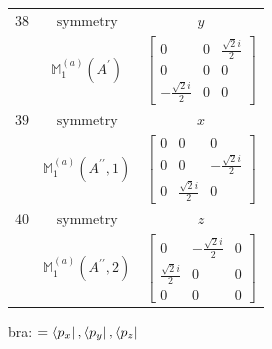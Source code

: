 \documentclass[fleqn,8pt,landscape]{jsarticle}
\begin{document}
\begin{longtable}{ccc}
$ 38 $ & $ \text{symmetry} $ & $ y $ \\
$  $ & $ \mathbb{M}_{1}^{(a)}(A^{\prime}) $ & $ \begin{bmatrix} 0 & 0 & \frac{\sqrt{2} i}{2} \\ 0 & 0 & 0 \\ - \frac{\sqrt{2} i}{2} & 0 & 0 \end{bmatrix} $ \\ \hline
$ 39 $ & $ \text{symmetry} $ & $ x $ \\
$  $ & $ \mathbb{M}_{1}^{(a)}(A^{\prime\prime},1) $ & $ \begin{bmatrix} 0 & 0 & 0 \\ 0 & 0 & - \frac{\sqrt{2} i}{2} \\ 0 & \frac{\sqrt{2} i}{2} & 0 \end{bmatrix} $ \\ \hline
$ 40 $ & $ \text{symmetry} $ & $ z $ \\
$  $ & $ \mathbb{M}_{1}^{(a)}(A^{\prime\prime},2) $ & $ \begin{bmatrix} 0 & - \frac{\sqrt{2} i}{2} & 0 \\ \frac{\sqrt{2} i}{2} & 0 & 0 \\ 0 & 0 & 0 \end{bmatrix} $ \\ \hline
\end{longtable}
bra: $=\bra{p_{x}}, \bra{p_{y}}, \bra{p_{z}}$
\end{document}
